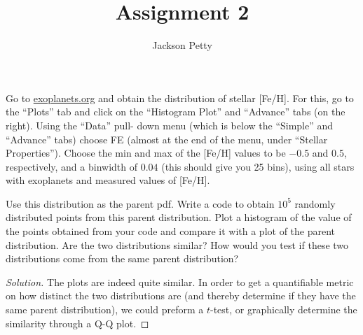 \documentclass[10pt, physics]{homework}
\author{Jackson Petty}
\title{Assignment 2}
\begin{document}
	\begin{problem}
		Go to \url{exoplanets.org} and obtain the distribution of stellar [Fe/H]. For this, go to the ``Plots'' tab and click on the “Histogram Plot” and ``Advance'' tabs (on the right). Using the ``Data'' pull- down menu (which is below the ``Simple'' and ``Advance'' tabs) choose FE (almost at the end of the menu, under “Stellar Properties”). Choose the min and max of the [Fe/H] values to be $-0.5$ and $0.5$, respectively, and a binwidth of $0.04$ (this should give you 25 bins), using all stars with exoplanets and measured values of [Fe/H].

		Use this distribution as the parent pdf. Write a code to obtain $10^5$ randomly distributed points from this parent distribution. Plot a histogram of the value of the points obtained from your code and compare it with a plot of the parent distribution. Are the two distributions similar? How would you test if these two distributions come from the same parent distribution?
	\end{problem}
	\begin{proof}[Solution]
		The plots are indeed quite similar.
		In order to get a quantifiable metric on how distinct the two distributions are (and thereby determine if they have the same parent distribution), we could preform a $t$-test, or graphically determine the similarity through a Q-Q plot.
	\end{proof}
\end{document}
